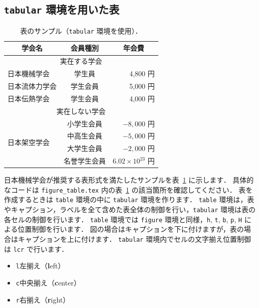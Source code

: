\subsection{\texttt{tabular} 環境を用いた表}
\label{ssec:tabular}

\begin{table}[tp]
    \centering
    \caption{表のサンプル（\texttt{tabular} 環境を使用）．}
    \label{table:tabular}
    \begin{tabular}{l|c|r} \hline\hline
        \multicolumn{1}{c|}{学会名}  & 会員種別  & \multicolumn{1}{c}{年会費} \\ \hline
        \multicolumn{3}{c}{実在する学会} \\ \hline
        日本機械学会    & 学生員    & 4,800 円 \\ \hline
        日本流体力学会  & 学生会員  & 5,000 円 \\ \hline
        日本伝熱学会    & 学生会員  & 4,000 円 \\ \hline
        \multicolumn{3}{c}{実在しない学会} \\ \hline
        \multirow{4}{*}{日本架空学会}& 小学生会員  & $-8,000$ 円 \\ \cline{2-3}
        & 中高生会員  & $-5,000$ 円 \\ \cline{2-3}
        & 大学生会員  & $-2,000$ 円 \\ \cline{2-3}
        & 名誉学生会員  & $6.02 \times 10^{23}$ 円 \\ \hline
    \end{tabular}
\end{table}

日本機械学会が推奨する表形式を満たしたサンプルを表~\ref{table:tabular} に示します．
具体的なコードは \verb|figure_table.tex| 内の表~\ref{table:tabular} の該当箇所を確認してください．
表を作成するときは \verb|table| 環境の中に \verb|tabular| 環境を作ります．
\verb|table| 環境は，表やキャプション，ラベルを全て含めた表全体の制御を行い，\verb|tabular| 環境は表の各セルの制御を行います．
\verb|table| 環境では \verb|figure| 環境と同様，\verb|h|, \verb|t|, \verb|b|, \verb|p|, \verb|H| による位置制御を行います．
図の場合はキャプションを下に付けますが，表の場合はキャプションを上に付けます．
\verb|tabular| 環境内でセルの文字揃え位置制御は \verb|lcr| で行います．

\begin{itemize}
    \item \verb|l|\quad 左揃え（\textbf{l}eft）
    \item \verb|c|\quad 中央揃え（\textbf{c}enter）
    \item \verb|r|\quad 右揃え（\textbf{r}ight）
\end{itemize}

